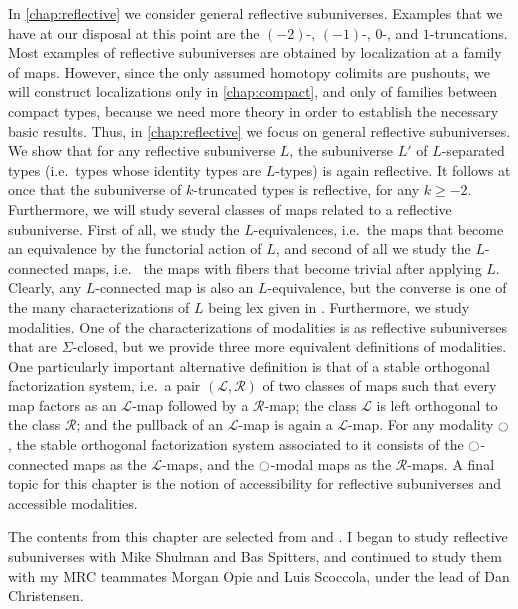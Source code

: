 In \cref{chap:reflective} we consider general reflective subuniverses. Examples that we have at our disposal at this point are the $(-2)$-, $(-1)$-, $0$-, and $1$-truncations. Most examples of reflective subuniverses are obtained by localization at a family of maps. However, since the only assumed homotopy colimits are pushouts, we will construct localizations only in \cref{chap:compact}, and only of families between compact types, because we need more theory in order to establish the necessary basic results. Thus, in \cref{chap:reflective} we focus on general reflective subuniverses. We show that for any reflective subuniverse $L$, the subuniverse $L'$ of $L$-separated types (i.e.~types whose identity types are $L$-types) is again reflective. It follows at once that the subuniverse of $k$-truncated types is reflective, for any $k\geq -2$. Furthermore, we will study several classes of maps related to a reflective subuniverse. First of all, we study the $L$-equivalences, i.e.~the maps that become an equivalence by the functorial action of $L$, and second of all we study the $L$-connected maps, i.e.~ the maps with fibers that become trivial after applying $L$. Clearly, any $L$-connected map is also an $L$-equivalence, but the converse is one of the many characterizations of $L$ being lex given in \cite{RijkeShulmanSpitters}. 
Furthermore, we study modalities. One of the characterizations of modalities is as reflective subuniverses that are $\Sigma$-closed, but we provide three more equivalent definitions of modalities. One particularly important alternative definition is that of a stable orthogonal factorization system, i.e.~a pair $(\mathcal{L},\mathcal{R})$ of two classes of maps such that every map factors as an $\mathcal{L}$-map followed by a $\mathcal{R}$-map; the class $\mathcal{L}$ is left orthogonal to the class $\mathcal{R}$; and the pullback of an $\mathcal{L}$-map is again a $\mathcal{L}$-map. For any modality ${\ocircle}$, the stable orthogonal factorization system associated to it consists of the ${\ocircle}$-connected maps as the $\mathcal{L}$-maps, and the ${\ocircle}$-modal maps as the $\mathcal{R}$-maps. A final topic for this chapter is the notion of accessibility for reflective subuniverses and accessible modalities. 

The contents from this chapter are selected from \cite{RijkeShulmanSpitters} and \cite{ChristensenOpieRijkeScoccola}. I began to study reflective subuniverses with Mike Shulman and Bas Spitters, and continued to study them with my MRC teammates Morgan Opie and Luis Scoccola, under the lead of Dan Christensen.

